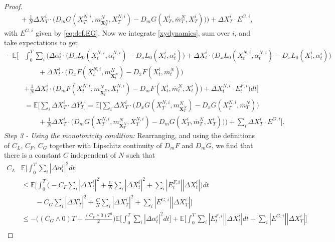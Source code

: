 \documentclass[11pt,reqno]{amsart}
\numberwithin{equation}{section}
\theoremstyle{definition}
\def\E{{\mathbb E}}
\newcommand{\bX}{\mathbf{X}}
\newcommand{\ov}{\overline}
\newcommand\cF{\mathcal F}
\newcommand\cL{\mathcal L}
\def \E{\mathbb{E}}
\begin{document}
\begin{proof}
\begin{align*}
  &\quad+ \frac{1}{N} \Delta X_T^i \cdot \big(D_m G(X_T^{N,i}, m_{\bX_T^N}^N, X_T^{N,i}) - D_m G(X_T^{i}, \ov{m}_T^N, X_T^{i})  \big) \big) + \Delta X_T^i \cdot  E^{G,i}, 
\end{align*}
with $ E^{G,i}$ given by \eqref{eq:def.EG}.
Now we integrate \eqref{xydynamics}, sum over $i$, and take expectations to get
\begin{align*}
  -\E\bigg[& \int_0^T \sum_i \bigg(\Delta \alpha_t^i \cdot \big(D_a L_0(X_t^{N,i}, \alpha_t^{N,i}) - D_a L_0(X_t^i, \alpha_t^i) \big) + \Delta X_t^i \cdot \big(D_x L_0(X_t^{N,i}, \alpha_t^{N,i}) - D_x L_0(X_t^i, \alpha_t^i) \big) \nonumber \\
  & \quad \quad + \Delta X_t^i \cdot \big(D_x F(X_t^{N,i}, m_{\bX_t^N}^N) - D_x F(X_t^i, \ov{m}_t^N)\big) \\
  & +\frac{1}{N} \Delta X_t^i \cdot \big(D_m F(X_t^{N,i}, m_{\bX_t^N}^N, X_t^{N,i}) - D_m F(X_t^{i}, \ov{m}_t^N, X_t^{i})  \big)+ \Delta X_t^{N,i} \cdot E_t^{F,i} \bigg) dt \bigg] \\
  &= \E\Big[ \sum_i \Delta X_T^i \cdot \Delta Y_T^i\Big] 
  = \E\Big[\sum_i \Delta X_T^i \cdot\big(D_x G(X_T^{N,i}, m_{\bX_T^N}^N) - D_x G(X_T^{N,i}, \ov{m}_T^N) \big) \\
  & \qquad + \frac{1}{N} \Delta X_T^i \cdot \big(D_m G(X_T^{N,i}, m_{\bX_T^N}^N, X_T^{N,i}) - D_m G(X_T^{i}, \ov{m}_T^N, X_T^{i})  \big) \big)  +  \sum_i \Delta X_T^i \cdot E^{G,i}\Big]. 
\end{align*}
\textit{Step 3 - Using the monotonicity condition:}
Rearranging, and using the definitions of $C_L$, $C_{F}$, $C_{G}$ together with Lipschitz continuity of $D_m F$ and $D_m G$, we find that there is a constant $C$ independent of $N$ such that
\begin{align} \label{smallness}
C_L &\E \bigg[\int_0^T \sum_i |\Delta \alpha_t^i|^2 dt \bigg] \nonumber \\
&\leq \E \bigg[ \int_0^T \Big( -C_{F} \sum_i |\Delta X_t^i|^2 + \frac{C}{N} \sum_i |\Delta X_t^i|^2 + \sum_i |E_t^{F,i}||\Delta X_t^i|  
\Big) dt \nonumber  \\
&\qquad - C_{G} \sum_i |\Delta X_T^i|^2 +\frac{C}{N} \sum_i |\Delta X_T^i|^2 + \sum_i |E^{G,i}| |\Delta X_T^i| \bigg] \nonumber \\
&\leq -\Big((C_{G} \wedge 0)T + \frac{(C_{F} \wedge 0) T^2}{2} \Big) \E\bigg[\int_0^T \sum_i |\Delta \alpha_t^i|^2 dt\bigg] + \E \bigg[ \int_0^T \sum_i |E_t^{F,i}||\Delta X_t^i|  dt + \sum_i |E^{G,i}| |\Delta X_T^i| \bigg]  \nonumber \\

\end{align}
\end{proof}
\end{document}
